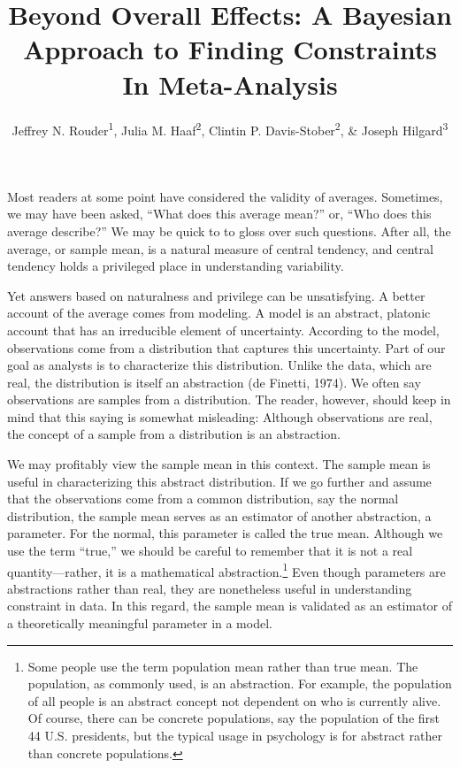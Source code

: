 \documentclass[english,man]{apa6}
\title{Beyond Overall Effects: A Bayesian Approach to Finding Constraints In
Meta-Analysis}
\author{Jeffrey N. Rouder\textsuperscript{1}, Julia M. Haaf\textsuperscript{2}, Clintin P. Davis-Stober\textsuperscript{2}, \& Joseph Hilgard\textsuperscript{3}}
\affiliation{
    \vspace{0.5cm}
          \textsuperscript{1} University of California, Irvine\\
          \textsuperscript{2} University of Missouri\\
          \textsuperscript{3} Illinois State University  }
\theoremstyle{definition}
\theoremstyle{definition}
\theoremstyle{definition}
\theoremstyle{remark}
\begin{document}
\maketitle

\setcounter{secnumdepth}{0}



Most readers at some point have considered the validity of averages.
Sometimes, we may have been asked, \enquote{What does this average
mean?} or, \enquote{Who does this average describe?} We may be quick to
to gloss over such questions. After all, the average, or sample mean, is
a natural measure of central tendency, and central tendency holds a
privileged place in understanding variability.

Yet answers based on naturalness and privilege can be unsatisfying. A
better account of the average comes from modeling. A model is an
abstract, platonic account that has an irreducible element of
uncertainty. According to the model, observations come from a
distribution that captures this uncertainty. Part of our goal as
analysts is to characterize this distribution. Unlike the data, which
are real, the distribution is itself an abstraction (de Finetti, 1974).
We often say observations are samples from a distribution. The reader,
however, should keep in mind that this saying is somewhat misleading:
Although observations are real, the concept of a sample from a
distribution is an abstraction.

We may profitably view the sample mean in this context. The sample mean
is useful in characterizing this abstract distribution. If we go further
and assume that the observations come from a common distribution, say
the normal distribution, the sample mean serves as an estimator of
another abstraction, a parameter. For the normal, this parameter is
called the true mean. Although we use the term \enquote{true,} we should
be careful to remember that it is not a real quantity---rather, it is a
mathematical abstraction.\footnote{Some people use the term population
  mean rather than true mean. The population, as commonly used, is an
  abstraction. For example, the population of all people is an abstract
  concept not dependent on who is currently alive. Of course, there can
  be concrete populations, say the population of the first 44 U.S.
  presidents, but the typical usage in psychology is for abstract rather
  than concrete populations.} Even though parameters are abstractions
rather than real, they are nonetheless useful in understanding
constraint in data. In this regard, the sample mean is validated as an
estimator of a theoretically meaningful parameter in a model.
\end{document}
